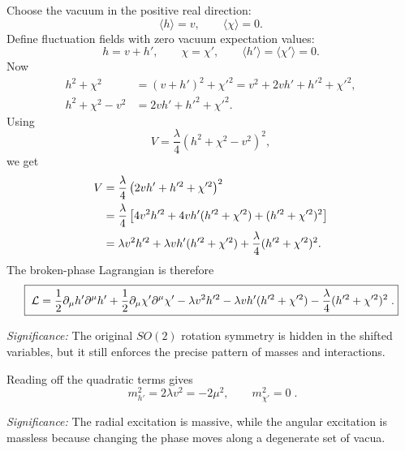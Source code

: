 Choose the vacuum in the positive real direction:
\begin{equation}
  \langle h\rangle=v,\qquad \langle\chi\rangle=0 .
  \label{eq:lec15:u1_chosen_vacuum}
\end{equation}
Define fluctuation fields with zero vacuum expectation values:
\begin{equation}
  h=v+h',
  \qquad
  \chi=\chi',
  \qquad
  \langle h'\rangle=\langle\chi'\rangle=0.
  \label{eq:lec15:u1_shift}
\end{equation}
Now
\begin{align}
  h^2+\chi^2
  &=(v+h')^2+\chi'^2
   =v^2+2vh'+h'^2+\chi'^2,
  \label{eq:lec15:u1_radius_shift}\\
  h^2+\chi^2-v^2
  &=2vh'+h'^2+\chi'^2 .
  \label{eq:lec15:u1_radius_minus_v}
\end{align}
Using
\[
  V=\frac{\lambda}{4}(h^2+\chi^2-v^2)^2,
\]
we get
\begin{align}
  V
  &=\frac{\lambda}{4}
    \left(2vh'+h'^2+\chi'^2\right)^2
    \notag\\
  &=\frac{\lambda}{4}
    \left[
      4v^2h'^2
      +4vh'(h'^2+\chi'^2)
      +(h'^2+\chi'^2)^2
    \right]
    \notag\\
  &=\lambda v^2h'^2
    +\lambda vh'(h'^2+\chi'^2)
    +\frac{\lambda}{4}(h'^2+\chi'^2)^2 .
  \label{eq:lec15:u1_potential_expansion}
\end{align}
The broken-phase Lagrangian is therefore
\begin{equation}
  \boxed{\;\mathcal{L}
  =\frac12\partial_\mu h'\partial^\mu h'
   +\frac12\partial_\mu\chi'\partial^\mu\chi'
   -\lambda v^2h'^2
   -\lambda vh'(h'^2+\chi'^2)
   -\frac{\lambda}{4}(h'^2+\chi'^2)^2\; .}
  \label{eq:lec15:u1_shifted_lagrangian}
\end{equation}

\textit{Significance:} The original $SO(2)$ rotation symmetry is hidden in the shifted variables, but it still enforces the precise pattern of masses and interactions.

Reading off the quadratic terms gives
\begin{equation}
  \boxed{\;m_{h'}^2=2\lambda v^2=-2\mu^2,\qquad m_{\chi'}^2=0\; .}
  \label{eq:lec15:u1_masses}
\end{equation}

\textit{Significance:} The radial excitation is massive, while the angular excitation is massless because changing the phase moves along a degenerate set of vacua.

